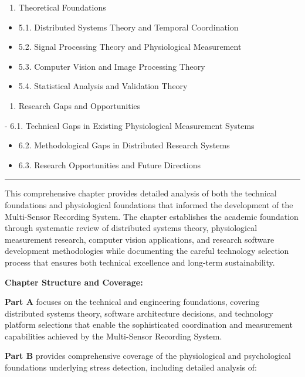 \documentclass[11pt,a4paper]{article}
\begin{document}
\begin{enumerate}
\item Theoretical Foundations

\end{enumerate}
\begin{itemize}
\item 5.1. Distributed Systems Theory and Temporal Coordination
\item 5.2. Signal Processing Theory and Physiological Measurement
\item 5.3. Computer Vision and Image Processing Theory
\item 5.4. Statistical Analysis and Validation Theory

\end{itemize}
\begin{enumerate}
\item Research Gaps and Opportunities

\end{enumerate}
-
6.1. Technical Gaps in Existing Physiological Measurement Systems
\begin{itemize}
\item 6.2. Methodological Gaps in Distributed Research Systems
\item 6.3. Research Opportunities and Future Directions

\end{itemize}
\hrule

This comprehensive chapter provides detailed analysis of both the technical foundations and physiological foundations
that informed the development of the Multi-Sensor Recording System. The chapter establishes the academic foundation
through systematic review of distributed systems theory, physiological measurement research, computer vision
applications, and research software development methodologies while documenting the careful technology selection process
that ensures both technical excellence and long-term sustainability.

\textbf{Chapter Structure and Coverage:}

\textbf{Part A} focuses on the technical and engineering foundations, covering distributed systems theory, software
architecture decisions, and technology platform selections that enable the sophisticated coordination and measurement
capabilities achieved by the Multi-Sensor Recording System.

\textbf{Part B} provides comprehensive coverage of the physiological and psychological foundations underlying stress
detection, including detailed analysis of:
\end{document}
